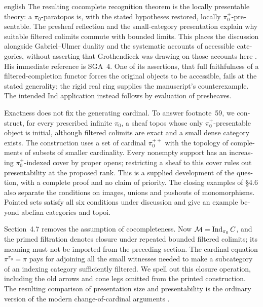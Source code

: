 \begin{otherlanguage}{english}
\begin{otherlanguage*}{english}
The resulting cocomplete recognition theorem is the locally presentable theory: a $\pi_0$-paratopos is, with the stated hypotheses restored, locally $\pi_0^+$-presentable. The presheaf reflection and the small-category presentation explain why suitable filtered colimits commute with bounded limits. This places the discussion alongside Gabriel--Ulmer duality and the systematic accounts of accessible categories, without asserting that Grothendieck was drawing on those accounts here \citep{GabrielUlmer1971,MakkaiPare1989,AdamekRosicky1994}. His immediate reference is SGA~4. One of its assertions, that full faithfulness of a filtered-completion functor forces the original objects to be accessible, fails at the stated generality; the rigid real ring supplies the manuscript's counterexample. The intended Ind application instead follows by evaluation of presheaves.

Exactness does not fix the generating cardinal. To answer footnote~59, we construct, for every prescribed infinite $\pi_0$, a sheaf topos whose only $\pi_0^+$-presentable object is initial, although filtered colimits are exact and a small dense category exists. The construction uses a set of cardinal $\pi_0^{++}$ with the topology of complements of subsets of smaller cardinality. Every nonempty support has an increasing $\pi_0^+$-indexed cover by proper opens; restricting a sheaf to this cover rules out presentability at the proposed rank. This is a supplied development of the question, with a complete proof and no claim of priority. The closing examples of \S4.6 also separate the conditions on images, unions and pushouts of monomorphisms. Pointed sets satisfy all six conditions under discussion and give an example beyond abelian categories and topoi.

Section~4.7 removes the assumption of cocompleteness. Now $\mathcal M=\operatorname{Ind}_{\pi_0}C$, and the primed filtration denotes closure under repeated bounded filtered colimits; its meaning must not be imported from the preceding section. The cardinal equation $\pi^{\pi_0}=\pi$ pays for adjoining all the small witnesses needed to make a subcategory of an indexing category sufficiently filtered. We spell out this closure operation, including the old arrows and cone legs omitted from the printed construction. The resulting comparison of presentation size and presentability is the ordinary version of the modern change-of-cardinal arguments \citep[\S3]{Vasey2020Accessible}.


\end{otherlanguage*}
\end{otherlanguage}
